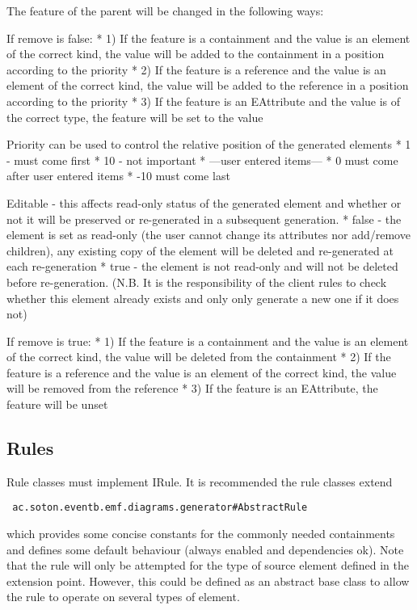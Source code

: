 The feature of the parent will be changed in the following ways:

If remove is false:
* 1) If the feature is a containment and the value is an element of the correct kind, the value will be added to the containment in a position according to the priority
* 2) If the feature is a reference and the value is an element of the correct kind, the value will be added to the reference in a position according to the priority
* 3) If the feature is an EAttribute and the value is of the correct type, the feature will be set to the value

Priority can be used to control the relative position of the generated elements  
* 1 - must come first
* 10 - not important
* ---user entered items---
* 0 must come after user entered items
* -10 must come last

Editable - this affects read-only status of the generated element and whether or not it will be preserved or re-generated in a subsequent generation.
* false - the element is set as read-only (the user cannot change its attributes nor add/remove children), any existing copy of the element will be deleted and re-generated at each re-generation
* true  - the element is not read-only and will not be deleted before re-generation. (N.B. It is the responsibility of the client rules to check whether this element already exists and only only generate a new one if it does not)

If remove is true:
* 1) If the feature is a containment and the value is an element of the correct kind, the value will be deleted from the containment
* 2) If the feature is a reference and the value is an element of the correct kind, the value will be removed from the reference
* 3) If the feature is an EAttribute, the feature will be unset 

\subsection{Rules}
\label{sec:rules}

Rule classes must implement IRule. It is recommended the rule classes extend
 \begin{verbatim}
 ac.soton.eventb.emf.diagrams.generator#AbstractRule
 \end{verbatim}
 which provides some concise constants for the commonly needed containments and defines some default behaviour (always enabled and dependencies ok).  Note that the rule will only be attempted for the type of source element defined in the extension point. However, this could be defined as an abstract base class to allow the rule to operate on several types of element.

